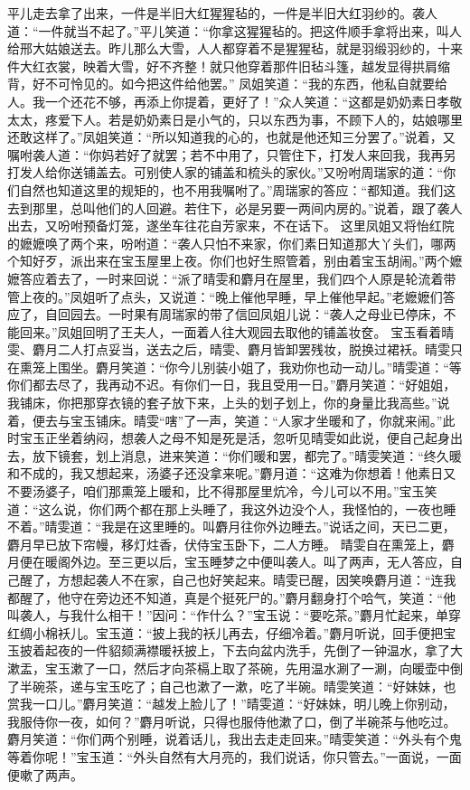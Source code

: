 \documentclass[12pt,oneside]{book}
\begin{document}
平儿走去拿了出来，一件是半旧大红猩猩毡的，一件是半旧大红羽纱的。袭人道：“一件就当不起了。”平儿笑道：“你拿这猩猩毡的。把这件顺手拿将出来，叫人给邢大姑娘送去。昨儿那么大雪，人人都穿着不是猩猩毡，就是羽缎羽纱的，十来件大红衣裳，映着大雪，好不齐整！就只他穿着那件旧毡斗篷，越发显得拱肩缩背，好不可怜见的。如今把这件给他罢。”
凤姐笑道：“我的东西，他私自就要给人。我一个还花不够，再添上你提着，更好了！”众人笑道：“这都是奶奶素日孝敬太太，疼爱下人。若是奶奶素日是小气的，只以东西为事，不顾下人的，姑娘哪里还敢这样了。”凤姐笑道：“所以知道我的心的，也就是他还知三分罢了。”说着，又嘱咐袭人道：“你妈若好了就罢；若不中用了，只管住下，打发人来回我，我再另打发人给你送铺盖去。可别使人家的铺盖和梳头的家伙。”又吩咐周瑞家的道：“你们自然也知道这里的规矩的，也不用我嘱咐了。”周瑞家的答应：“都知道。我们这去到那里，总叫他们的人回避。若住下，必是另要一两间内房的。”说着，跟了袭人出去，又吩咐预备灯笼，遂坐车往花自芳家来，不在话下。
这里凤姐又将怡红院的嬷嬷唤了两个来，吩咐道：“袭人只怕不来家，你们素日知道那大丫头们，哪两个知好歹，派出来在宝玉屋里上夜。你们也好生照管着，别由着宝玉胡闹。”两个嬷嬷答应着去了，一时来回说：“派了晴雯和麝月在屋里，我们四个人原是轮流着带管上夜的。”凤姐听了点头，又说道：“晚上催他早睡，早上催他早起。”老嬷嬷们答应了，自回园去。一时果有周瑞家的带了信回凤姐儿说：“袭人之母业已停床，不能回来。”凤姐回明了王夫人，一面着人往大观园去取他的铺盖妆奁。
宝玉看着晴雯、麝月二人打点妥当，送去之后，晴雯、麝月皆卸罢残妆，脱换过裙袄。晴雯只在熏笼上围坐。麝月笑道：“你今儿别装小姐了，我劝你也动一动儿。”晴雯道：“等你们都去尽了，我再动不迟。有你们一日，我且受用一日。”麝月笑道：“好姐姐，我铺床，你把那穿衣镜的套子放下来，上头的划子划上，你的身量比我高些。”说着，便去与宝玉铺床。晴雯“嗐”了一声，笑道：“人家才坐暖和了，你就来闹。”此时宝玉正坐着纳闷，想袭人之母不知是死是活，忽听见晴雯如此说，便自己起身出去，放下镜套，划上消息，进来笑道：“你们暖和罢，都完了。”晴雯笑道：“终久暖和不成的，我又想起来，汤婆子还没拿来呢。”麝月道：“这难为你想着！他素日又不要汤婆子，咱们那熏笼上暖和，比不得那屋里炕冷，今儿可以不用。”宝玉笑道：“这么说，你们两个都在那上头睡了，我这外边没个人，我怪怕的，一夜也睡不着。”晴雯道：“我是在这里睡的。叫麝月往你外边睡去。”说话之间，天已二更，麝月早已放下帘幔，移灯炷香，伏侍宝玉卧下，二人方睡。
晴雯自在熏笼上，麝月便在暖阁外边。至三更以后，宝玉睡梦之中便叫袭人。叫了两声，无人答应，自己醒了，方想起袭人不在家，自己也好笑起来。晴雯已醒，因笑唤麝月道：“连我都醒了，他守在旁边还不知道，真是个挺死尸的。”麝月翻身打个哈气，笑道：“他叫袭人，与我什么相干！”因问：“作什么？”宝玉说：“要吃茶。”麝月忙起来，单穿红绸小棉袄儿。宝玉道：“披上我的袄儿再去，仔细冷着。”麝月听说，回手便把宝玉披着起夜的一件貂颏满襟暖袄披上，下去向盆内洗手，先倒了一钟温水，拿了大漱盂，宝玉漱了一口，然后才向茶槅上取了茶碗，先用温水涮了一涮，向暖壶中倒了半碗茶，递与宝玉吃了；自己也漱了一漱，吃了半碗。晴雯笑道：“好妹妹，也赏我一口儿。”麝月笑道：“越发上脸儿了！”晴雯道：“好妹妹，明儿晚上你别动，我服侍你一夜，如何？”麝月听说，只得也服侍他漱了口，倒了半碗茶与他吃过。麝月笑道：“你们两个别睡，说着话儿，我出去走走回来。”晴雯笑道：“外头有个鬼等着你呢！”宝玉道：“外头自然有大月亮的，我们说话，你只管去。”一面说，一面便嗽了两声。
\end{document}

